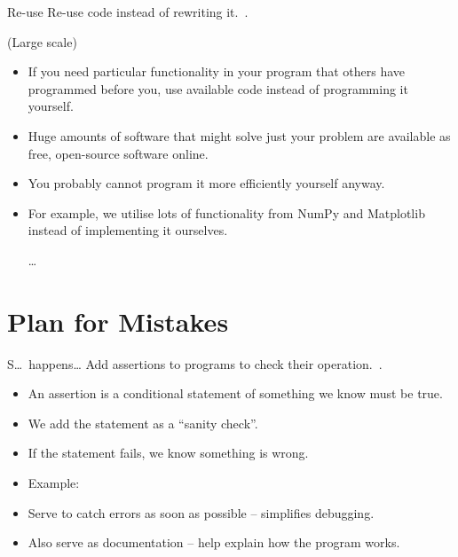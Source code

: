 \documentclass[english]{beamer}
\newcommand{\sectionslide}{\centering\vspace*{25mm}%
  {\bfseries\LARGE \insertsection}}
\begin{document}

\begin{frame}{\insertsection}{Re-use}
  Re-use code instead of rewriting it.~\cite{Wilson2013}.

  (Large scale)
  \begin{itemize}
  \item If you need particular functionality in your program that
    others have programmed before you, use available code instead of
    programming it yourself.
  \item Huge amounts of software that might solve just your problem
    are available as free, open-source software online.
  \item You probably cannot program it more efficiently yourself
    anyway.
  \item For example, we utilise lots of functionality from NumPy and
    Matplotlib instead of implementing it ourselves.
    \begin{overlayarea}{\textwidth}{2cm}
      \ldots
    \end{overlayarea}
  \end{itemize}
\end{frame}


\section{Plan for Mistakes}

\begin{frame}
  \sectionslide
\end{frame}


\begin{frame}[fragile]{\insertsection}{S\ldots\ happens\ldots}
  Add assertions to programs to check their
  operation.~\cite{Wilson2013}.
  \begin{itemize}
  \item An assertion is a conditional statement of something we know
    must be true.
  \item We add the statement as a ``sanity check''.
  \item If the statement fails, we know something is wrong.
  \item Example:
    
  \item Serve to catch errors as soon as possible -- simplifies
    debugging.
  \item Also serve as documentation -- help explain how the program
    works.
  \end{itemize}
\end{frame}
\end{document}

